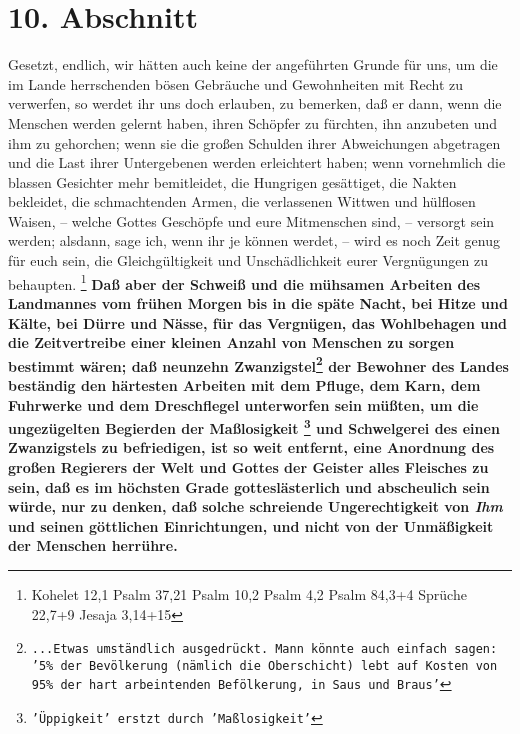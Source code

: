 \section{10. Abschnitt} \label{kap18_ab10}

Gesetzt, endlich, wir hätten auch keine der angeführten Grunde für uns, um die
im Lande herrschenden bösen Gebräuche und Gewohnheiten mit Recht zu verwerfen,
so werdet ihr uns doch erlauben, zu bemerken, daß er dann, wenn die Menschen
werden gelernt haben, ihren Schöpfer zu fürchten, ihn anzubeten und ihm zu
gehorchen; wenn sie die großen Schulden ihrer Abweichungen abgetragen und die
Last ihrer Untergebenen werden erleichtert haben; wenn vornehmlich die blassen
Gesichter mehr bemitleidet, die Hungrigen gesättiget, die Nakten bekleidet, die
schmachtenden Armen, die verlassenen Wittwen und hülflosen Waisen, -- welche
Gottes Geschöpfe und eure Mitmenschen sind, -- versorgt sein werden; alsdann,
sage ich, wenn ihr je können werdet, -- wird es noch Zeit genug für euch sein,
die Gleichgültigkeit und Unschädlichkeit eurer Vergnügungen zu
behaupten.
\footnote{
Kohelet 12,1
Psalm 37,21
Psalm 10,2
Psalm 4,2
Psalm 84,3+4
Sprüche 22,7+9
Jesaja 3,14+15}
\label{ref:18_10_ungeraechtikeit} \textbf{Daß aber der Schweiß und die mühsamen
Arbeiten
des Landmannes vom frühen Morgen bis in die späte Nacht, bei Hitze und Kälte,
bei Dürre und Nässe, für das Vergnügen, das Wohlbehagen und die Zeitvertreibe
einer kleinen Anzahl von Menschen zu sorgen bestimmt wären; daß neunzehn
Zwanzigstel\footnote{\texttt{...Etwas umständlich ausgedrückt. Mann könnte auch
einfach sagen: '5\% der Bevölkerung (nämlich die Oberschicht) lebt auf Kosten
von 95\% der hart arbeintenden Befölkerung, in Saus und Braus'}} der Bewohner
des Landes beständig den härtesten Arbeiten mit dem
Pfluge, dem Karn, dem Fuhrwerke und dem Dreschflegel unterworfen sein müßten, um
die ungezügelten Begierden der Maßlosigkeit
\footnote{\texttt{'Üppigkeit' erstzt durch 'Maßlosigkeit'}} und Schwelgerei des
einen Zwanzigstels
zu befriedigen, ist so weit entfernt, eine Anordnung des großen Regierers der
Welt und Gottes der Geister alles Fleisches zu sein, daß es im höchsten Grade
gotteslästerlich und abscheulich sein würde, nur zu denken, daß solche
schreiende Ungerechtigkeit von \textit{Ihm} und seinen göttlichen Einrichtungen,
und
nicht von der Unmäßigkeit der Menschen herrühre.}
